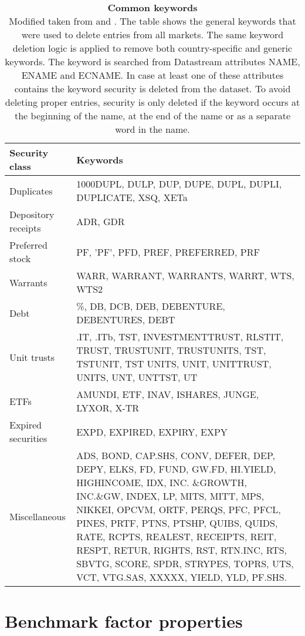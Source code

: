 \documentclass[12pt]{article}
\begin{document}
\begin{table}[H] 
\footnotesize
\caption[Common keywords]{\textbf{Common keywords}\\ Modified taken from \protect\citet{Ince2006} and \protect\citet{HANAUER2023106712}. The table shows the general keywords that were used to delete entries from all markets. The same keyword deletion logic is applied to remove both country-specific and generic keywords. The keyword is searched from Datastream attributes NAME, ENAME and ECNAME. In case at least one of these attributes contains the keyword security is deleted from the dataset. To avoid deleting proper entries, security is only deleted if the keyword occurs at the beginning of the name, at the end of the name or as a separate word in the name.}
 \label{table:GeneralKeywords}
\centering
\begin{tabularx}{\textwidth}{l X}
\toprule
Security class 	& Keywords \\
\midrule
Duplicates 		& 1000DUPL, DULP, DUP, DUPE, DUPL, DUPLI, DUPLICATE, XSQ, XETa  \\[1ex]
Depository receipts	& ADR, GDR \\[1ex]
Preferred stock 	&  PF, ’PF’, PFD, PREF, PREFERRED, PRF\\ [1ex]
Warrants 			&  WARR, WARRANT, WARRANTS, WARRT, WTS, WTS2\\[1ex]
Debt 			& \%, DB, DCB, DEB, DEBENTURE, DEBENTURES, DEBT\\[1ex]
Unit trusts 		& .IT, .ITb, TST, INVESTMENTTRUST, RLSTIT, TRUST, TRUSTUNIT, TRUSTUNITS, TST, TSTUNIT, TST UNITS, UNIT, UNITTRUST, UNITS, UNT, UNTTST, UT\\[1ex]
ETFs 			& AMUNDI, ETF, INAV, ISHARES, JUNGE, LYXOR, X-TR\\[1ex]
Expired securities 	& EXPD, EXPIRED, EXPIRY, EXPY\\[1ex]
Miscellaneous 		& ADS, BOND, CAP.SHS, CONV, DEFER, DEP, DEPY, ELKS, FD, FUND, GW.FD, HI.YIELD, HIGHINCOME, IDX, INC.								\&GROWTH, INC.\&GW, INDEX, LP, MITS, MITT, MPS, NIKKEI, OPCVM, ORTF, PERQS, 												PFC, PFCL, PINES, PRTF, PTNS, PTSHP, QUIBS, QUIDS, RATE, RCPTS, REALEST, RECEIPTS, REIT, RESPT, 								RETUR, RIGHTS, RST, RTN.INC, RTS, SBVTG, SCORE, SPDR, STRYPES, TOPRS, UTS, VCT, VTG.SAS, 									XXXXX, YIELD, YLD, PF.SHS.\\
 \bottomrule
 \end{tabularx}
 \end{table} 

\clearpage

\section{Benchmark factor properties} \label{BenchmarkFactorProperties}
\renewcommand{\thefigure}{B.\arabic{figure}}
\setcounter{figure}{0}
\renewcommand{\thetable}{B.\arabic{table}}
\setcounter{table}{0}
\end{document}
